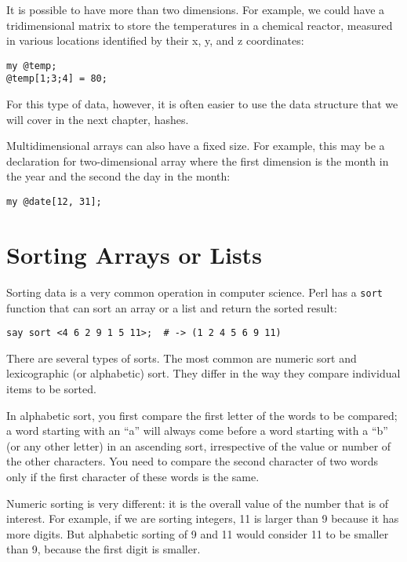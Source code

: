 It is possible to have more than two dimensions. For example, 
we could have a tridimensional matrix to store the temperatures 
in a chemical reactor, measured in various locations identified 
by their x, y, and z coordinates:

\begin{verbatim}
my @temp;
@temp[1;3;4] = 80;
\end{verbatim}

For this type of data, however, it is often easier to use the 
data structure that we will cover in the next chapter, hashes.

Multidimensional arrays can also have a fixed size. For 
example, this may be a declaration for two-dimensional array 
where the first dimension is the month in the year and 
the second the day in the month:

\begin{verbatim}
my @date[12, 31];
\end{verbatim}


\section{Sorting Arrays or Lists}
\label{sorting}

Sorting data is a very common operation in computer 
science. Perl has a {\tt sort} function that can sort 
an array or a list and return the sorted result:

\begin{verbatim}
say sort <4 6 2 9 1 5 11>;  # -> (1 2 4 5 6 9 11)
\end{verbatim}

There are several types of sorts. The most common are numeric 
sort and lexicographic (or alphabetic) sort. They differ 
in the way they compare individual items to be sorted. 

In alphabetic sort, you first compare the first letter of 
the words to be compared; a word starting with an ``a'' 
will always come before a word starting with a ``b'' 
(or any other letter) in an ascending sort, irrespective 
of the value or number of the other characters. You need to 
compare the second character of two words only if 
the first character of these words is the same. 

Numeric sorting is very different: it is the overall 
value of the number that is of interest. For example, 
if we are sorting integers, 11 is larger than 9 because 
it has more digits. But alphabetic sorting of 9 and 11 
would consider 11 to be smaller than 9, because the 
first digit is smaller.

